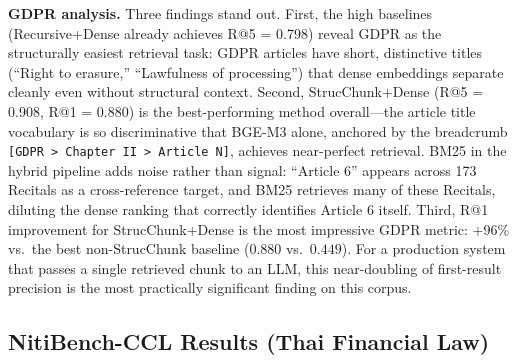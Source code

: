 \documentclass[sn-mathphys,Numbered]{sn-jnl}%
\begin{document}
\textbf{GDPR analysis.}  Three findings stand out.  First, the high baselines (Recursive+Dense already achieves R@5 = 0.798) reveal GDPR as the structurally easiest retrieval task: GDPR articles have short, distinctive titles (``Right to erasure,'' ``Lawfulness of processing'') that dense embeddings separate cleanly even without structural context.  Second, StrucChunk+Dense (R@5 = 0.908, R@1 = 0.880) is the best-performing method overall---the article title vocabulary is so discriminative that BGE-M3 alone, anchored by the breadcrumb \texttt{[GDPR > Chapter II > Article N]}, achieves near-perfect retrieval.  BM25 in the hybrid pipeline adds noise rather than signal: ``Article 6'' appears across 173 Recitals as a cross-reference target, and BM25 retrieves many of these Recitals, diluting the dense ranking that correctly identifies Article 6 itself.  Third, R@1 improvement for StrucChunk+Dense is the most impressive GDPR metric: +96\% vs.\ the best non-StrucChunk baseline ($0.880$ vs.\ $0.449$).  For a production system that passes a single retrieved chunk to an LLM, this near-doubling of first-result precision is the most practically significant finding on this corpus.

\subsection{NitiBench-CCL Results (Thai Financial Law)}
\end{document}
